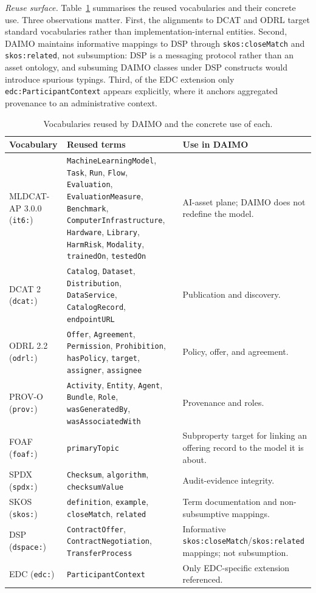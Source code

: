 \documentclass[Afour,sagev,times]{sagej}
\newcommand{\code}[1]{\texttt{#1}}
\begin{document}
\medskip\noindent\emph{Reuse surface.}\label{sec:reuse}
Table~\ref{tab:reuse} summarises the reused vocabularies and their concrete use. Three observations matter. First, the alignments to DCAT and ODRL target standard vocabularies rather than implementation-internal entities. Second, DAIMO maintains informative mappings to DSP through \code{skos:closeMatch} and \code{skos:related}, not subsumption: DSP is a messaging protocol rather than an asset ontology, and subsuming DAIMO classes under DSP constructs would introduce spurious typings. Third, of the EDC extension only \code{edc:ParticipantContext} appears explicitly, where it anchors aggregated provenance to an administrative context.

\begin{table}[tb]
\small\sf\centering
\caption{Vocabularies reused by DAIMO and the concrete use of each.\label{tab:reuse}}
\begin{tabular}{@{}p{2.6cm}p{5cm}p{7cm}@{}}
\toprule
\textbf{Vocabulary} & \textbf{Reused terms} & \textbf{Use in DAIMO} \\
\midrule
MLDCAT-AP 3.0.0 (\code{it6:}) & \code{MachineLearningModel}, \code{Task}, \code{Run}, \code{Flow}, \code{Evaluation}, \code{EvaluationMeasure}, \code{Benchmark}, \code{ComputerInfrastructure}, \code{Hardware}, \code{Library}, \code{HarmRisk}, \code{Modality}, \code{trainedOn}, \code{testedOn} & AI-asset plane; DAIMO does not redefine the model. \\
DCAT 2 (\code{dcat:}) & \code{Catalog}, \code{Dataset}, \code{Distribution}, \code{DataService}, \code{CatalogRecord}, \code{endpointURL} & Publication and discovery. \\
ODRL 2.2 (\code{odrl:}) & \code{Offer}, \code{Agreement}, \code{Permission}, \code{Prohibition}, \code{hasPolicy}, \code{target}, \code{assigner}, \code{assignee} & Policy, offer, and agreement. \\
PROV-O (\code{prov:}) & \code{Activity}, \code{Entity}, \code{Agent}, \code{Bundle}, \code{Role}, \code{wasGeneratedBy}, \code{wasAssociatedWith} & Provenance and roles. \\
FOAF (\code{foaf:})~\cite{foaf} & \code{primaryTopic} & Subproperty target for linking an offering record to the model it is about. \\
SPDX (\code{spdx:})~\cite{spdx} & \code{Checksum}, \code{algorithm}, \code{checksumValue} & Audit-evidence integrity. \\
SKOS (\code{skos:})~\cite{skos} & \code{definition}, \code{example}, \code{closeMatch}, \code{related} & Term documentation and non-subsumptive mappings. \\
DSP (\code{dspace:}) & \code{ContractOffer}, \code{ContractNegotiation}, \code{TransferProcess} & Informative \code{skos:closeMatch}/\code{skos:related} mappings; not subsumption. \\
EDC (\code{edc:}) & \code{ParticipantContext} & Only EDC-specific extension referenced. \\
\bottomrule
\end{tabular}
\end{table}
\end{document}
